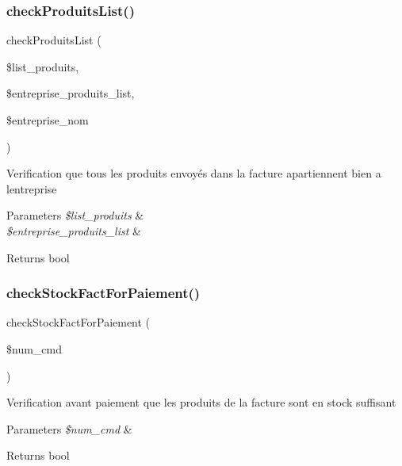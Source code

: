 \subsubsection{\texorpdfstring{check\+Produits\+List()}{checkProduitsList()}}
{\footnotesize\ttfamily check\+Produits\+List (\begin{DoxyParamCaption}\item[{}]{\$list\+\_\+produits,  }\item[{}]{\$entreprise\+\_\+produits\+\_\+list,  }\item[{}]{\$entreprise\+\_\+nom }\end{DoxyParamCaption})}

Verification que tous les produits envoyés dans la facture apartiennent bien a l\textquotesingle{}entreprise 
\begin{DoxyParams}{Parameters}
{\em \$list\+\_\+produits} & \\
\hline
{\em \$entreprise\+\_\+produits\+\_\+list} & \\
\hline
\end{DoxyParams}
\begin{DoxyReturn}{Returns}
bool 
\end{DoxyReturn}
\mbox{\label{class_app_1_1_http_1_1_controllers_1_1_facture_controller_a9afa0af460ccb1466d9425829c71dd89}} 
\subsubsection{\texorpdfstring{check\+Stock\+Fact\+For\+Paiement()}{checkStockFactForPaiement()}}
{\footnotesize\ttfamily check\+Stock\+Fact\+For\+Paiement (\begin{DoxyParamCaption}\item[{}]{\$num\+\_\+cmd }\end{DoxyParamCaption})}

Verification avant paiement que les produits de la facture sont en stock suffisant 
\begin{DoxyParams}{Parameters}
{\em \$num\+\_\+cmd} & \\
\hline
\end{DoxyParams}
\begin{DoxyReturn}{Returns}
bool 
\end{DoxyReturn}
\mbox{\label{class_app_1_1_http_1_1_controllers_1_1_facture_controller_abb9c6059d08505a4b6b6dafd694f54c2}} 
